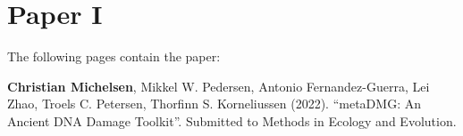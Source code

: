\chapter{Paper I}
\label{chapter:metadmg}

The following pages contain the paper:
\vspace*{1cm}


\textbf{Christian Michelsen}, Mikkel W. Pedersen, Antonio Fernandez-Guerra, Lei Zhao, Troels C. Petersen, Thorfinn S. Korneliussen (2022). ``metaDMG: An Ancient DNA Damage Toolkit''. Submitted to Methods in Ecology and Evolution.

\clearpage



